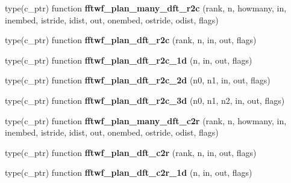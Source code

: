 \begin{DoxyCompactItemize}
\item 
type(c\+\_\+ptr) function {\bfseries fftwf\+\_\+plan\+\_\+many\+\_\+dft\+\_\+r2c} (rank, n, howmany, in, inembed, istride, idist, out, onembed, ostride, odist, flags)\hypertarget{interfacefftw3_1_1fftw__plan__gen_adede53fedb9684bd74a1e84a9738b007}{}\label{interfacefftw3_1_1fftw__plan__gen_adede53fedb9684bd74a1e84a9738b007}

\item 
type(c\+\_\+ptr) function {\bfseries fftwf\+\_\+plan\+\_\+dft\+\_\+r2c} (rank, n, in, out, flags)\hypertarget{interfacefftw3_1_1fftw__plan__gen_acf6a39858d6dd5294b71c962e0e6c2dc}{}\label{interfacefftw3_1_1fftw__plan__gen_acf6a39858d6dd5294b71c962e0e6c2dc}

\item 
type(c\+\_\+ptr) function {\bfseries fftwf\+\_\+plan\+\_\+dft\+\_\+r2c\+\_\+1d} (n, in, out, flags)\hypertarget{interfacefftw3_1_1fftw__plan__gen_ad5085ac77507c2c81ce78234102e720a}{}\label{interfacefftw3_1_1fftw__plan__gen_ad5085ac77507c2c81ce78234102e720a}

\item 
type(c\+\_\+ptr) function {\bfseries fftwf\+\_\+plan\+\_\+dft\+\_\+r2c\+\_\+2d} (n0, n1, in, out, flags)\hypertarget{interfacefftw3_1_1fftw__plan__gen_a5df5d1ee02363fe7092c67a31d4dcba6}{}\label{interfacefftw3_1_1fftw__plan__gen_a5df5d1ee02363fe7092c67a31d4dcba6}

\item 
type(c\+\_\+ptr) function {\bfseries fftwf\+\_\+plan\+\_\+dft\+\_\+r2c\+\_\+3d} (n0, n1, n2, in, out, flags)\hypertarget{interfacefftw3_1_1fftw__plan__gen_a926c13a3c5d103dda9a128344ecf9477}{}\label{interfacefftw3_1_1fftw__plan__gen_a926c13a3c5d103dda9a128344ecf9477}

\item 
type(c\+\_\+ptr) function {\bfseries fftwf\+\_\+plan\+\_\+many\+\_\+dft\+\_\+c2r} (rank, n, howmany, in, inembed, istride, idist, out, onembed, ostride, odist, flags)\hypertarget{interfacefftw3_1_1fftw__plan__gen_ade0117ef3fc777f57f2f485a60691cb2}{}\label{interfacefftw3_1_1fftw__plan__gen_ade0117ef3fc777f57f2f485a60691cb2}

\item 
type(c\+\_\+ptr) function {\bfseries fftwf\+\_\+plan\+\_\+dft\+\_\+c2r} (rank, n, in, out, flags)\hypertarget{interfacefftw3_1_1fftw__plan__gen_a500e4d16da7e49813ce2bcf16e80030f}{}\label{interfacefftw3_1_1fftw__plan__gen_a500e4d16da7e49813ce2bcf16e80030f}

\item 
type(c\+\_\+ptr) function {\bfseries fftwf\+\_\+plan\+\_\+dft\+\_\+c2r\+\_\+1d} (n, in, out, flags)\hypertarget{interfacefftw3_1_1fftw__plan__gen_ae73d382d2119e5099ef3a3389b634624}{}\label{interfacefftw3_1_1fftw__plan__gen_ae73d382d2119e5099ef3a3389b634624}


\end{DoxyCompactItemize}

